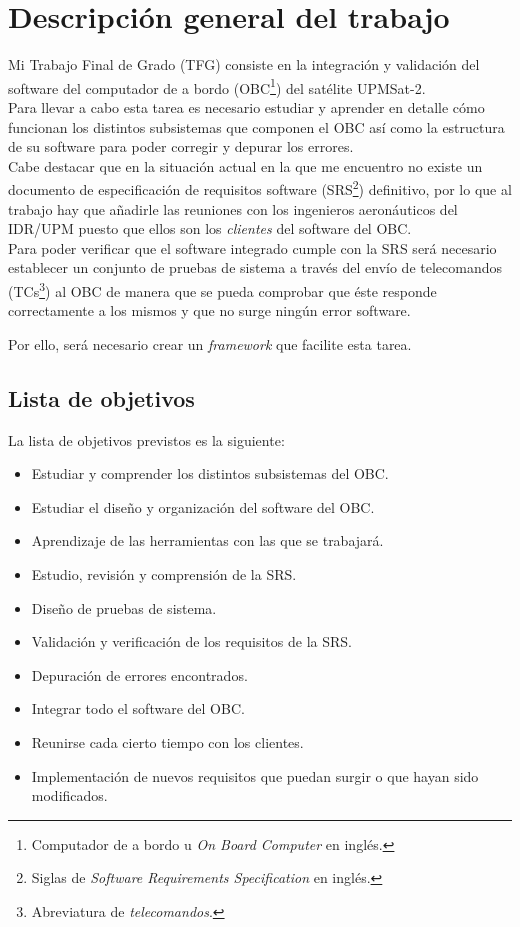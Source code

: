 
\section{Descripción general del trabajo}
Mi Trabajo Final de Grado (TFG) consiste en la integración y validación del
software del computador de a bordo (OBC\footnote{Computador de a bordo u
  \textit{On Board Computer} en inglés.}) del satélite UPMSat-2.\\

  Para llevar a cabo esta tarea es necesario estudiar y aprender en detalle cómo
  funcionan los distintos subsistemas que componen el OBC así como la estructura
  de su software para poder corregir y depurar los errores.\\

  Cabe destacar que en la situación actual en la que me encuentro no existe un
  documento de especificación de requisitos software (SRS\footnote{Siglas de
    \textit{Software Requirements Specification} en inglés.}) definitivo, por lo
  que al trabajo hay que añadirle las reuniones con los ingenieros aeronáuticos
  del IDR/UPM puesto que ellos son los \textit{clientes} del software del OBC.\\

  Para poder verificar que el software integrado cumple con la SRS será
  necesario establecer un conjunto de pruebas de sistema a través del envío
  de telecomandos (TCs\footnote{Abreviatura de \textit{telecomandos}.}) al OBC de manera que se pueda comprobar que éste
  responde correctamente a los mismos y que no surge ningún error software.

  Por ello, será necesario crear un \textit{framework} que facilite esta tarea.\\

  \subsection{Lista de objetivos}
  La lista de objetivos previstos es la siguiente:
  \begin{itemize}
  \item Estudiar y comprender los distintos subsistemas del OBC.
  \item Estudiar el diseño y organización del software del OBC.
  \item Aprendizaje de las herramientas con las que se trabajará.
  \item Estudio, revisión y comprensión de la SRS.
  \item Diseño de pruebas de sistema.
  \item Validación y verificación de los requisitos de la SRS.
  \item Depuración de errores encontrados.
  \item Integrar todo el software del OBC.
  \item Reunirse cada cierto tiempo con los clientes.
  \item Implementación de nuevos requisitos que puedan surgir o que hayan sido
    modificados.
  \end{itemize}